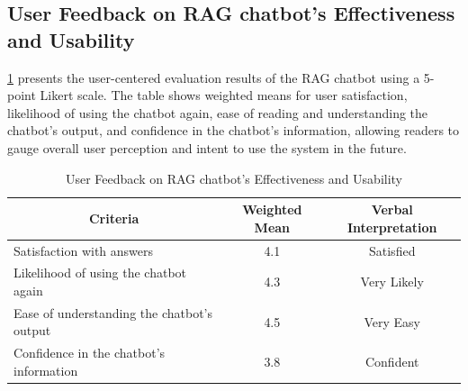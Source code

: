 \begin{refsection}
\section*{User Feedback on RAG chatbot’s Effectiveness and Usability}
\ref{tab:user_feedback_table} presents the user-centered evaluation results of the RAG chatbot using a 5-point Likert scale. The table shows weighted means for user satisfaction, likelihood of using the chatbot again, ease of reading and understanding the chatbot’s output, and confidence in the chatbot’s information, allowing readers to gauge overall user perception and intent to use the system in the future.

\begin{table}[H]
    \centering
    \caption{User Feedback on RAG chatbot’s Effectiveness and Usability}
    \label{tab:user_feedback_table}
    \begin{tabular}{m{5cm} c c}
        \hline
        \multicolumn{1}{c}{\textbf{Criteria}} & \textbf{Weighted Mean} & \textbf{Verbal Interpretation} \\
        \hline
        Satisfaction with answers & 4.1 & Satisfied \\
        \hline
        Likelihood of using the chatbot again & 4.3 & Very Likely \\
        \hline
        Ease of understanding the chatbot’s output & 4.5 & Very Easy \\
        \hline
        Confidence in the chatbot’s information & 3.8 & Confident \\
        \hline
    \end{tabular}
\end{table}


\end{refsection}
